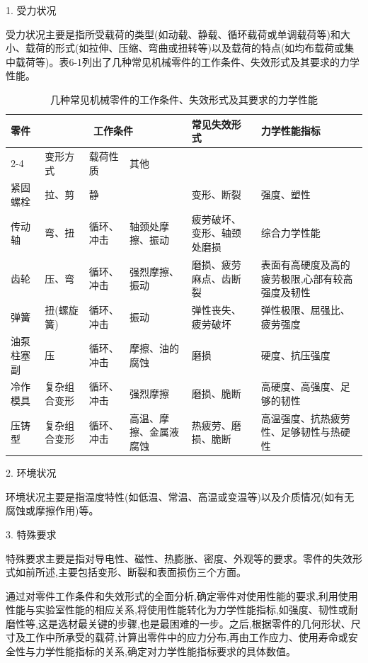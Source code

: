 \documentclass[UTF8]{ctexbook}
\newcommand{\◎}{\ensuremath{\bigcirc}}
\begin{document}
1. 受力状况

受力状况主要是指所受载荷的类型(如动载、静载、循环载荷或单调载荷等)和大小、载荷的形式(如拉伸、压缩、弯曲或扭转等)以及载荷的特点(如均布载荷或集中载荷等)。表6-1列出了几种常见机械零件的工作条件、失效形式及其要求的力学性能。

\begin{table}[H]
\centering
\caption{几种常见机械零件的工作条件、失效形式及其要求的力学性能}
\footnotesize\setlength{\tabcolsep}{3pt}
\begin{tabular}{|p{1.2cm}|p{2cm}|p{2cm}|p{2.5cm}|p{4cm}|p{4cm}|}
\hline
\multirow{2}{1.2cm}{零件} & \multicolumn{3}{c|}{工作条件} & \multirow{2}{4cm}{常见失效形式} & \multirow{2}{4cm}{力学性能指标} \\
\cline{2-4}
 & 变形方式 & 载荷性质 & 其他 & & \\
\hline
紧固螺栓 & 拉、剪 & 静 & & 变形、断裂 & 强度、塑性 \\
\hline
传动轴 & 弯、扭 & 循环、冲击 & 轴颈处摩擦、振动 & 疲劳破坏、变形、轴颈处磨损 & 综合力学性能 \\
\hline
齿轮 & 压、弯 & 循环、冲击 & 强烈摩擦、振动 & 磨损、疲劳麻点、齿断裂 & 表面有高硬度及高的疲劳极限,心部有较高强度及韧性 \\
\hline
弹簧 & 扭(螺旋簧) & 循环、冲击 & 振动 & 弹性丧失、疲劳破坏 & 弹性极限、屈强比、疲劳强度 \\
\hline
油泵柱塞副 & 压 & 循环、冲击 & 摩擦、油的腐蚀 & 磨损 & 硬度、抗压强度 \\
\hline
冷作模具 & 复杂组合变形 & 循环、冲击 & 强烈摩擦 & 磨损、脆断 & 高硬度、高强度、足够的韧性 \\
\hline
压铸型 & 复杂组合变形 & 循环、冲击 & 高温、摩擦、金属液腐蚀 & 热疲劳、磨损、脆断 & 高温强度、抗热疲劳性、足够韧性与热硬性 \\
\hline
\end{tabular}\end{table}

2. 环境状况

环境状况主要是指温度特性(如低温、常温、高温或变温等)以及介质情况(如有无腐蚀或摩擦作用)等。

3. 特殊要求

特殊要求主要是指对导电性、磁性、热膨胀、密度、外观等的要求。零件的失效形式如前所述,主要包括变形、断裂和表面损伤三个方面。

通过对零件工作条件和失效形式的全面分析,确定零件对使用性能的要求,利用使用性能与实验室性能的相应关系,将使用性能转化为力学性能指标,如强度、韧性或耐磨性等,这是选材最关键的步骤,也是最困难的一步。之后,根据零件的几何形状、尺寸及工作中所承受的载荷,计算出零件中的应力分布,再由工作应力、使用寿命或安全性与力学性能指标的关系,确定对力学性能指标要求的具体数值。
\end{document}
